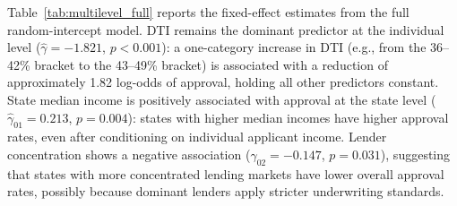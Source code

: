 \documentclass[12pt,letterpaper]{article}
\begin{document}
Table~\ref{tab:multilevel_full} reports the fixed-effect estimates from the full
random-intercept model. DTI remains the dominant predictor at the individual level
($\hat{\gamma} = -1.821$, $p < 0.001$): a one-category increase in DTI (e.g., from the
36--42\% bracket to the 43--49\% bracket) is associated with a reduction of approximately
1.82 log-odds of approval, holding all other predictors constant. State median income
is positively associated with approval at the state level ($\hat{\gamma}_{01} = 0.213$,
$p = 0.004$): states with higher median incomes have higher approval rates, even after
conditioning on individual applicant income. Lender concentration shows a negative
association ($\hat{\gamma}_{02} = -0.147$, $p = 0.031$), suggesting that states with
more concentrated lending markets have lower overall approval rates, possibly because
dominant lenders apply stricter underwriting standards.
\end{document}
